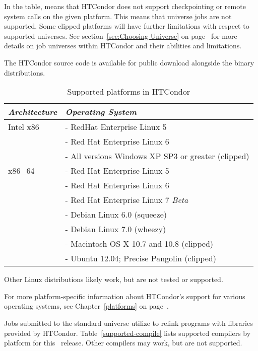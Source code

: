 In the table,  means that HTCondor does not support
checkpointing or remote system calls on the given platform. 
This means that  universe jobs are not supported.
Some clipped platforms will have further limitations with respect
to supported universes.
See section~\ref{sec:Choosing-Universe} on
page~\pageref{sec:Choosing-Universe} for more details on job universes
within HTCondor and their abilities and limitations.

The HTCondor source code is available for 
public download alongside the binary distributions.

\begin{center}
\begin{table}[hbt]
\begin{tabular}{|p{6cm}p{7cm}|} \hline
\emph{Architecture} & \emph{Operating System} \\ \hline \hline
Intel x86 & - RedHat Enterprise Linux 5 \\
 & - Red Hat Enterprise Linux 6 \\
 & - All versions Windows XP SP3 or greater (clipped) \\
x86\_64 & - Red Hat Enterprise Linux 5 \\ 
 & - Red Hat Enterprise Linux 6 \\
 & - Red Hat Enterprise Linux 7 \emph{Beta} \\
 & - Debian Linux 6.0 (squeeze) \\
 & - Debian Linux 7.0 (wheezy) \\ \hline 
 & - Macintosh OS X 10.7 and 10.8 (clipped) \\ \hline
 & - Ubuntu 12.04; Precise Pangolin (clipped) \\ \hline
\end{tabular}
\caption{\label{table:supported-platforms}Supported platforms in HTCondor \VersionNotice}
\end{table}
\end{center}


\Note Other Linux distributions likely work, but are not tested
or supported.

For more platform-specific information about HTCondor's support for
various operating systems, see Chapter~\ref{platforms} on
page~\pageref{platforms}. 



Jobs submitted to the standard universe utilize 
to relink programs with libraries provided by HTCondor.
Table~\ref{supported-compile} lists supported compilers by
platform for this \VersionNotice\ release.
Other compilers may work, but are not supported.

